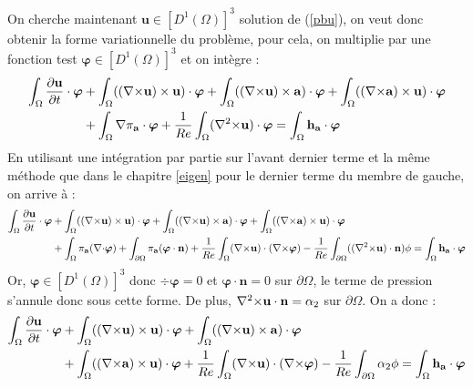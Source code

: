 On cherche maintenant $\mathbf{u}\in [D^1(\Omega)]^3$ solution de (\ref{pbu}), on veut donc obtenir la forme variationnelle du problème, pour cela, on multiplie par une fonction test $\bm{\varphi}\in [D^1(\Omega)]^3$ et on intègre :
\begin{align*}
\int_\Omega \frac{\partial \mathbf{u}}{\partial t}\cdot \bm{\varphi} &+ \int_\Omega (({\nabla\times} \mathbf{u})\times \mathbf{u})\cdot \bm{\varphi} + \int_\Omega (({\nabla\times} \mathbf{u})\times \mathbf{a})\cdot\bm{\varphi} + \int_\Omega (({\nabla\times} \mathbf{a})\times \mathbf{u})\cdot\bm{\varphi} \\
&+ \int_\Omega {\nabla}\pi_{\mathbf{a}}\cdot\bm{\varphi} + \frac{1}{Re}\int_\Omega ({\nabla^2\times} \mathbf{u})\cdot\bm{\varphi} = \int_\Omega \mathbf{h_a}\cdot\bm{\varphi}
\end{align*}
En utilisant une intégration par partie sur l'avant dernier terme et la même méthode que dans le chapitre \ref{eigen} pour le dernier terme du membre de gauche, on arrive à :
\begin{align*}
\int_\Omega \frac{\partial \mathbf{u}}{\partial t}\cdot \bm{\varphi} &+ \int_\Omega (({\nabla\times} \mathbf{u})\times \mathbf{u})\cdot \bm{\varphi} + \int_\Omega (({\nabla\times} \mathbf{u})\times \mathbf{a})\cdot\bm{\varphi} + \int_\Omega (({\nabla\times} \mathbf{a})\times \mathbf{u})\cdot\bm{\varphi}\\
&+ \int_\Omega \pi_{\mathbf{a}}({\nabla\cdot}\bm{\varphi}) + \int_{\partial \Omega} \pi_{\mathbf{a}}(\bm{\varphi}\cdot \mathbf{n}) + \frac{1}{Re}\int_\Omega ({\nabla\times} \mathbf{u})\cdot({\nabla\times}\bm{\varphi}) -\frac{1}{Re}\int_{\partial\Omega} (({\nabla^2\times} \mathbf{u})\cdot \mathbf{n})\phi = \int_\Omega \mathbf{h_a}\cdot\bm{\varphi}
\end{align*}
Or, $\bm{\varphi}\in [D^1(\Omega)]^3$ donc $\div\bm{\varphi}=0$ et $\bm{\varphi}\cdot \mathbf{n}=0$ sur $\partial\Omega$, le terme de pression s'annule donc sous cette forme. De plus, ${\nabla^2\times} \mathbf{u}\cdot \mathbf{n}=\alpha_2$ sur $\partial\Omega$. On a donc :
\begin{equation}\label{fvu}
\begin{aligned}
\int_\Omega \frac{\partial \mathbf{u}}{\partial t}\cdot \bm{\varphi} &+ \int_\Omega (({\nabla\times} \mathbf{u})\times \mathbf{u})\cdot \bm{\varphi} + \int_\Omega (({\nabla\times} \mathbf{u})\times \mathbf{a})\cdot\bm{\varphi} \\
&+ \int_\Omega (({\nabla\times} \mathbf{a})\times \mathbf{u})\cdot\bm{\varphi} + \frac{1}{Re}\int_\Omega ({\nabla\times} \mathbf{u})\cdot({\nabla\times}\bm{\varphi}) -\frac{1}{Re}\int_{\partial\Omega} \alpha_2\phi = \int_\Omega \mathbf{h_a}\cdot\bm{\varphi}
\end{aligned}
\end{equation}

